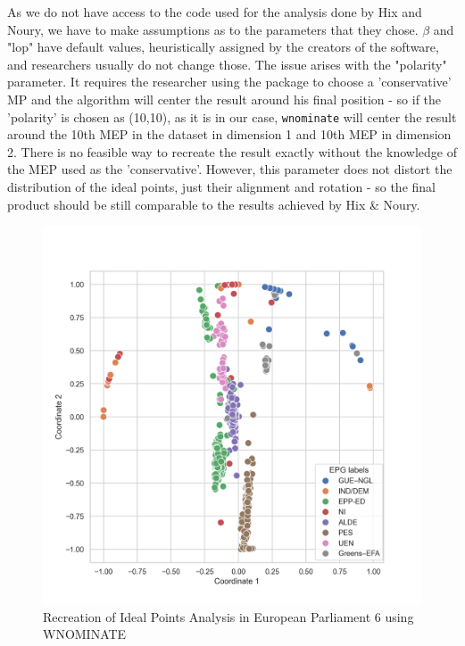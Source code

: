 \documentclass{report}
\begin{document}
    As we do not have access to the code used for the analysis done by Hix and Noury, we have to make assumptions as
    to the parameters that they chose. \( \beta \) and "lop" have default values, heuristically assigned by the
    creators of the software, and researchers usually do not change those. The issue arises with the "polarity"
    parameter. It requires the researcher using the package to choose a 'conservative' MP and the algorithm will
    center the result around his final position - so if the 'polarity' is chosen as (10,10), as it is in our case, \texttt{wnominate}
    will center the result around the 10th MEP in the dataset in dimension 1 and 10th MEP in dimension 2. There is
    no feasible way to recreate the result exactly without the knowledge of the MEP used as the 'conservative'.
    However, this parameter does not distort the distribution of the ideal points, just their alignment and rotation
    - so the final product should be still comparable to the results achieved by Hix & Noury.

    \begin{figure}[H]
        \centering
        \includegraphics[width=1\textwidth]{Graphs/WNOMINATE2d.png}
        \caption{Recreation of Ideal Points Analysis in European Parliament 6 using WNOMINATE}
        \label{fig:WNOMINATE 6}
    \end{figure}
\end{document}
